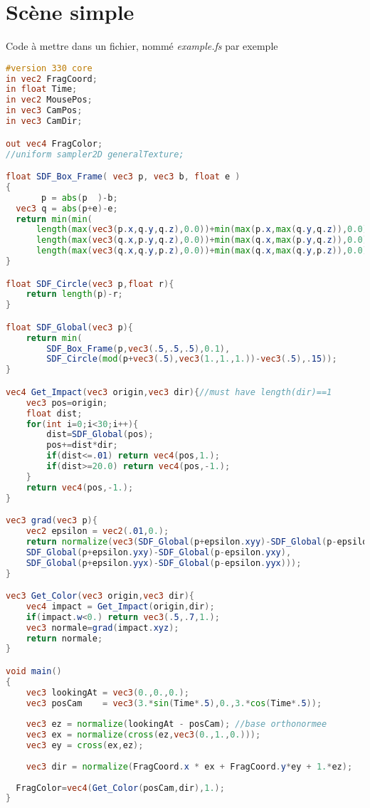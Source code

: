 \section{Scène simple}
Code à mettre dans un fichier, nommé \emph{example.fs} par exemple
\begin{lstlisting}[language=GLSL]
#version 330 core
in vec2 FragCoord;
in float Time;
in vec2 MousePos;
in vec3 CamPos;
in vec3 CamDir;

out vec4 FragColor;
//uniform sampler2D generalTexture;

float SDF_Box_Frame( vec3 p, vec3 b, float e )
{
       p = abs(p  )-b;
  vec3 q = abs(p+e)-e;
  return min(min(
      length(max(vec3(p.x,q.y,q.z),0.0))+min(max(p.x,max(q.y,q.z)),0.0),
      length(max(vec3(q.x,p.y,q.z),0.0))+min(max(q.x,max(p.y,q.z)),0.0)),
      length(max(vec3(q.x,q.y,p.z),0.0))+min(max(q.x,max(q.y,p.z)),0.0));
}

float SDF_Circle(vec3 p,float r){
    return length(p)-r;
}

float SDF_Global(vec3 p){
    return min(
        SDF_Box_Frame(p,vec3(.5,.5,.5),0.1),
        SDF_Circle(mod(p+vec3(.5),vec3(1.,1.,1.))-vec3(.5),.15));
}

vec4 Get_Impact(vec3 origin,vec3 dir){//must have length(dir)==1 
    vec3 pos=origin;
    float dist;
    for(int i=0;i<30;i++){
        dist=SDF_Global(pos);
        pos+=dist*dir;
        if(dist<=.01) return vec4(pos,1.);
        if(dist>=20.0) return vec4(pos,-1.);
    }
    return vec4(pos,-1.);
}

vec3 grad(vec3 p){
    vec2 epsilon = vec2(.01,0.);
    return normalize(vec3(SDF_Global(p+epsilon.xyy)-SDF_Global(p-epsilon.xyy),
    SDF_Global(p+epsilon.yxy)-SDF_Global(p-epsilon.yxy),
    SDF_Global(p+epsilon.yyx)-SDF_Global(p-epsilon.yyx)));
}

vec3 Get_Color(vec3 origin,vec3 dir){
    vec4 impact = Get_Impact(origin,dir);
    if(impact.w<0.) return vec3(.5,.7,1.);
    vec3 normale=grad(impact.xyz);
    return normale;
}

void main()
{
    vec3 lookingAt = vec3(0.,0.,0.);
    vec3 posCam    = vec3(3.*sin(Time*.5),0.,3.*cos(Time*.5));
    
    vec3 ez = normalize(lookingAt - posCam); //base orthonormee
    vec3 ex = normalize(cross(ez,vec3(0.,1.,0.)));
    vec3 ey = cross(ex,ez);
    
    vec3 dir = normalize(FragCoord.x * ex + FragCoord.y*ey + 1.*ez);
    
  FragColor=vec4(Get_Color(posCam,dir),1.);
}
\end{lstlisting}